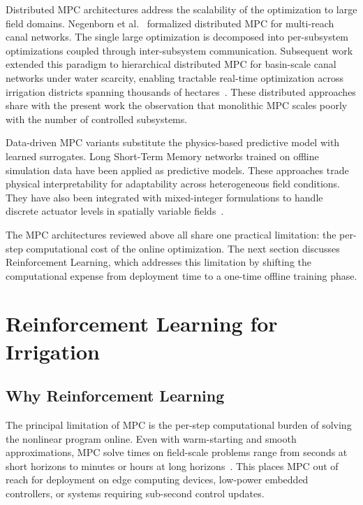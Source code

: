 Distributed MPC architectures address the scalability of the
optimization to large field domains. Negenborn et
al.~\cite{negenborn2009distmpc} formalized distributed MPC for
multi-reach canal networks. The single large optimization is
decomposed into per-subsystem optimizations coupled through
inter-subsystem communication. Subsequent work extended this paradigm
to hierarchical distributed MPC for basin-scale canal networks under
water scarcity, enabling tractable real-time optimization across
irrigation districts spanning thousands of
hectares~\cite{LopezJimenez2022}. These distributed approaches share
with the present work the observation that monolithic MPC scales
poorly with the number of controlled subsystems.

Data-driven MPC variants substitute the physics-based predictive
model with learned surrogates. Long Short-Term Memory networks
trained on offline simulation data have been applied as predictive
models. These approaches trade physical interpretability for
adaptability across heterogeneous field conditions. They have also
been integrated with mixed-integer formulations to handle discrete
actuator levels in spatially variable fields~\cite{Maniam2026}.

The MPC architectures reviewed above all share one practical
limitation: the per-step computational cost of the online
optimization. The next section discusses Reinforcement Learning,
which addresses this limitation by shifting the computational
expense from deployment time to a one-time offline training phase.

\section{Reinforcement Learning for Irrigation}
\label{sec:lit-rl}

\subsection{Why Reinforcement Learning}
\label{ssec:lit-rl-why}

The principal limitation of MPC is the per-step computational burden
of solving the nonlinear program online. Even with warm-starting and
smooth approximations, MPC solve times on field-scale problems range
from seconds at short horizons to minutes or hours at long
horizons~\cite{Lopezjimenez2024}. This places MPC out of reach for
deployment on edge computing devices, low-power embedded controllers,
or systems requiring sub-second control updates.


